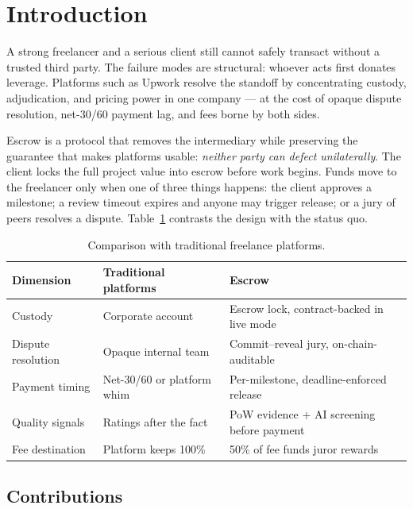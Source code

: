 \documentclass[11pt,letterpaper]{article}
\begin{document}
\vspace{0.1in}

\section{Introduction}

A strong freelancer and a serious client still cannot safely transact without a
trusted third party. The failure modes are structural: whoever acts first donates
leverage. Platforms such as Upwork resolve the standoff by concentrating custody,
adjudication, and pricing power in one company --- at the cost of opaque dispute
resolution, net-30/60 payment lag, and fees borne by both sides.

Escrow is a protocol that removes the intermediary while preserving the guarantee
that makes platforms usable: \emph{neither party can defect unilaterally}. The client
locks the full project value into escrow before work begins. Funds move to the
freelancer only when one of three things happens: the client approves a milestone; a
review timeout expires and anyone may trigger release; or a jury of peers resolves a
dispute. Table~\ref{tab:statusquo} contrasts the design with the status quo.

\begin{table}[h]
\centering\small
\caption{Comparison with traditional freelance platforms.}
\label{tab:statusquo}
\begin{tabular}{@{}lll@{}}
\toprule
\textbf{Dimension} & \textbf{Traditional platforms} & \textbf{Escrow} \\
\midrule
Custody & Corporate account & Escrow lock, contract-backed in live mode \\
Dispute resolution & Opaque internal team & Commit--reveal jury, on-chain-auditable \\
Payment timing & Net-30/60 or platform whim & Per-milestone, deadline-enforced release \\
Quality signals & Ratings after the fact & PoW evidence + AI screening before payment \\
Fee destination & Platform keeps 100\% & 50\% of fee funds juror rewards \\
\bottomrule
\end{tabular}
\end{table}

\subsection{Contributions}
\end{document}
